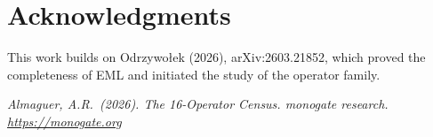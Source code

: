 \documentclass[12pt,a4paper]{article}
\theoremstyle{definition}
\begin{document}
\section*{Acknowledgments}

This work builds on Odrzywołek (2026), arXiv:2603.21852, which proved the
completeness of EML and initiated the study of the operator family.

\bigskip
\noindent\textit{Almaguer, A.R.\ (2026). The 16-Operator Census.
monogate research. \url{https://monogate.org}}
\end{document}
